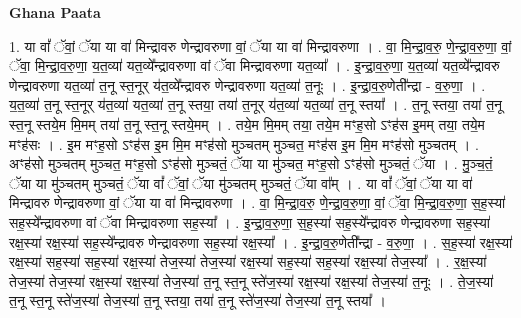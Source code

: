 \documentclass[17pt]{extarticle}
\begin{document}
\textbf{Ghana Paata } \newline

1. या वां᳚ ॅवां॒ ॅया या वा॑ मिन्द्रावरु णेन्द्रावरुणा वां॒ ॅया या वा॑ मिन्द्रावरुणा । . वा॒ मि॒न्द्रा॒व॒रु॒ णे॒न्द्रा॒व॒रु॒णा॒ वां॒ ॅवा॒ मि॒न्द्रा॒व॒रु॒णा॒ य॒त॒व्या॑ यत॒व्ये᳚न्द्रावरुणा वां ॅवा मिन्द्रावरुणा यत॒व्या᳚ । . इ॒न्द्रा॒व॒रु॒णा॒ य॒त॒व्या॑ यत॒व्ये᳚न्द्रावरु णेन्द्रावरुणा यत॒व्या॑ त॒नू स्त॒नूर् य॑त॒व्ये᳚न्द्रावरु णेन्द्रावरुणा यत॒व्या॑ त॒नूः । . इ॒न्द्रा॒व॒रु॒णेती᳚न्द्रा - व॒रु॒णा॒ । . य॒त॒व्या॑ त॒नू स्त॒नूर् य॑त॒व्या॑ यत॒व्या॑ त॒नू स्तया॒ तया॑ त॒नूर् य॑त॒व्या॑ यत॒व्या॑ त॒नू स्तया᳚ । . त॒नू स्तया॒ तया॑ त॒नू स्त॒नू स्तये॒म मि॒मम् तया॑ त॒नू स्त॒नू स्तये॒मम् । . तये॒म मि॒मम् तया॒ तये॒म मꣳह॒सो ऽꣳह॑स इ॒मम् तया॒ तये॒म मꣳह॑सः । . इ॒म मꣳह॒सो ऽꣳह॑स इ॒म मि॒म मꣳह॑सो मुञ्चतम् मुञ्चत॒ मꣳह॑स इ॒म मि॒म मꣳह॑सो मुञ्चतम् । . अꣳह॑सो मुञ्चतम् मुञ्चत॒ मꣳह॒सो ऽꣳह॑सो मुञ्चतं॒ ॅया या मु॑ञ्चत॒ मꣳह॒सो ऽꣳह॑सो मुञ्चतं॒ ॅया । . मु॒ञ्च॒तं॒ ॅया या मु॑ञ्चतम् मुञ्चतं॒ ॅया वां᳚ ॅवां॒ ॅया मु॑ञ्चतम् मुञ्चतं॒ ॅया वा᳚म् । . या वां᳚ ॅवां॒ ॅया या वा॑ मिन्द्रावरु णेन्द्रावरुणा वां॒ ॅया या वा॑ मिन्द्रावरुणा । . वा॒ मि॒न्द्रा॒व॒रु॒ णे॒न्द्रा॒व॒रु॒णा॒ वां॒ ॅवा॒ मि॒न्द्रा॒व॒रु॒णा॒ स॒ह॒स्या॑ सह॒स्ये᳚न्द्रावरुणा वां ॅवा मिन्द्रावरुणा सह॒स्या᳚ । . इ॒न्द्रा॒व॒रु॒णा॒ स॒ह॒स्या॑ सह॒स्ये᳚न्द्रावरु णेन्द्रावरुणा सह॒स्या॑ रक्ष॒स्या॑ रक्ष॒स्या॑ सह॒स्ये᳚न्द्रावरु णेन्द्रावरुणा सह॒स्या॑ रक्ष॒स्या᳚ । . इ॒न्द्रा॒व॒रु॒णेती᳚न्द्रा - व॒रु॒णा॒ । . स॒ह॒स्या॑ रक्ष॒स्या॑ रक्ष॒स्या॑ सह॒स्या॑ सह॒स्या॑ रक्ष॒स्या॑ तेज॒स्या॑ तेज॒स्या॑ रक्ष॒स्या॑ सह॒स्या॑ सह॒स्या॑ रक्ष॒स्या॑ तेज॒स्या᳚ । . र॒क्ष॒स्या॑ तेज॒स्या॑ तेज॒स्या॑ रक्ष॒स्या॑ रक्ष॒स्या॑ तेज॒स्या॑ त॒नू स्त॒नू स्ते॑ज॒स्या॑ रक्ष॒स्या॑ रक्ष॒स्या॑ तेज॒स्या॑ त॒नूः । . ते॒ज॒स्या॑ त॒नू स्त॒नू स्ते॑ज॒स्या॑ तेज॒स्या॑ त॒नू स्तया॒ तया॑ त॒नू स्ते॑ज॒स्या॑ तेज॒स्या॑ त॒नू स्तया᳚ । \newline
\end{document}
